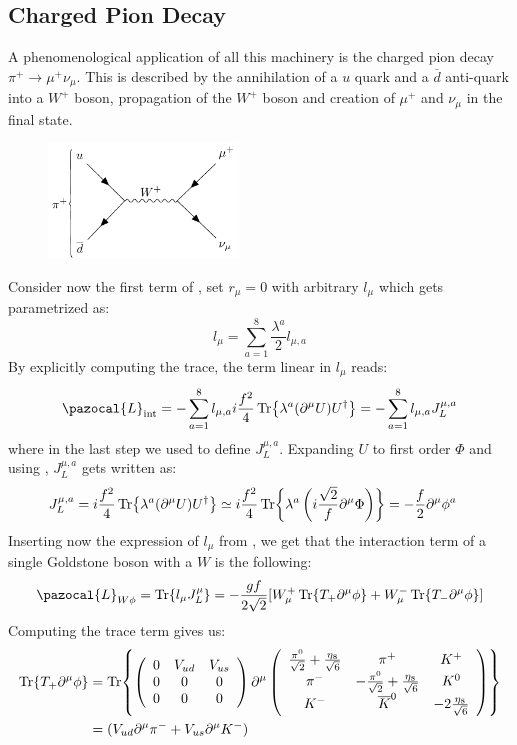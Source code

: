 \documentclass[../main.tex]{subfiles}
\begin{document}
\subsection{Charged Pion Decay}
A phenomenological application of all this machinery is the charged pion decay $\pi^+\to\mu^+\nu_\mu$. This is described by the annihilation of a $u$ quark and a $\overline{d}$ anti-quark into a $W^+$ boson, propagation of the $W^+$ boson and creation of $\mu^+$ and $\nu_\mu$ in the final state.
\begin{figure}[h]
    \centering\includegraphics[width=0.45\textwidth]{Images/piondecay.pdf}
    \caption*{}
\end{figure}
\newpage
Consider now the first term of , set $r_\mu=0$ with arbitrary $l_\mu$ which gets parametrized as:
\[
l_\mu=\sum_{a=1}^8\frac{\lambda^a}{2}l_{\mu,a}
\]
By explicitly computing the trace, the term linear in $l_\mu$ reads:
\[
\pazocal{L}_{\text{int}}=-\sum_{a=1}^8l_{\mu,a}i\frac{f^2}{4}\Tr{\lambda^a(\partial^\mu U)U^\dagger}=-\sum_{a=1}^8l_{\mu,a}J_L^{\mu,a}
\]
where in the last step we used  to define $J_L^{\mu,a}$. Expanding $U$ to first order $\Phi$ and using , $J_L^{\mu,a}$ gets written as:
\[
\begin{aligned}
J_L^{\mu,a}&=i\frac{f^2}{4}\Tr{\lambda^a(\partial^\mu U)U^\dagger}\simeq i\frac{f^2}{4}\Tr{\lambda^a\left(i\frac{\sqrt{2}}{f}\partial^\mu\Phi\right)}=-\frac{f}{2}\partial^\mu\phi^a
\end{aligned}
\]
Inserting now the expression of $l_\mu$ from , we get that the interaction term of a single Goldstone boson with a $W$ is the following:
\[
\pazocal{L}_{W\phi}=\Tr{l_\mu J^\mu_L}=-\frac{gf}{2\sqrt{2}}[W_\mu^+\Tr{T_+\partial^\mu\phi}+W_\mu^-\Tr{T_-\partial^\mu\phi}]
\]
Computing the trace term gives us:
\begin{align*}
\Tr{T_+\partial^\mu\phi}&=\Tr{\left(\begin{array}{ccc}
    0 & V_{ud} & V_{us} \\
    0 & 0 & 0 \\
    0 & 0 & 0
\end{array}\right)\partial^\mu\left(\begin{array}{ccc}
    \frac{\pi^0}{\sqrt{2}}+\frac{\eta_8}{\sqrt{6}} & \pi^+ & K^+ \\
    \pi^- & -\frac{\pi^0}{\sqrt{2}}+\frac{\eta_8}{\sqrt{6}} & K^0 \\
    K^- & \overline{K}^0 & -2\frac{\eta_8}{\sqrt{6}} \\
\end{array}\right)}\\
&=(V_{ud}\partial^\mu\pi^-+V_{us}\partial^\mu K^-)
\end{align*}
\end{document}
